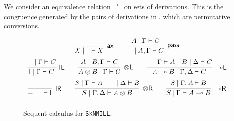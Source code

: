 \documentclass[runningheads]{llncs}
\newcommand{\tl}{\otimes \mathsf{L}}
\newcommand{\tr}{\otimes \mathsf{R}}
\newcommand{\lright}{{\multimap}\mathsf{R}}
\newcommand{\lleft}{{\multimap}\mathsf{L}}
\newcommand{\pass}{\mathsf{pass}}
\newcommand{\unitl}{\mathsf{IL}}
\newcommand{\unitr}{\mathsf{IR}}
\newcommand{\otR}{\tr}
\newcommand{\lolliR}{\lright}
\newcommand{\lolliL}{\lleft}
\newcommand{\ax}{\mathsf{ax}}
\newcommand{\ot}{\otimes}
\newcommand{\lolli}{\multimap}
\newcommand{\I}{\mathsf{I}}
\newcommand{\SkNMILL}{\texttt{SkNMILL}}
\begin{document}
We consider an equivalence relation $\circeq$ on sets of derivations. This is the congruence generated by the pairs of derivations in , which are permutative conversions. %
\begin{figure}[t]
  \[
  \def\arraystretch{2.5}
  \begin{array}{c}
    \infer[\ax]{X \mid \quad \vdash X}{}
    \qquad
    \infer[\pass]{- \mid A , \Gamma \vdash C}{A \mid \Gamma \vdash C}
    \\
    \infer[\unitl]{\I \mid \Gamma \vdash C}{- \mid \Gamma \vdash C}
    \qquad
    \infer[\tl]{A \ot B \mid \Gamma \vdash C}{A \mid B , \Gamma \vdash C}
    \qquad
    \infer[\lleft]{A \lolli B \mid \Gamma , \Delta \vdash C}{
      - \mid \Gamma \vdash A
      &
      B \mid \Delta \vdash C
    }
    \\
    \infer[\unitr]{- \mid \quad \vdash \I}{}
    \qquad
    \infer[\tr]{S \mid \Gamma , \Delta \vdash A \ot B}{
      S \mid \Gamma \vdash A
      &
      - \mid \Delta \vdash B
    }
    \qquad
    \infer[\lolliR]{S \mid \Gamma \vdash A \lolli B}{S \mid \Gamma , A \vdash B}
  \end{array}
  \]
\caption{Sequent calculus for \SkNMILL.}
\label{fig:seqcalc}  
\end{figure}
\end{document}
